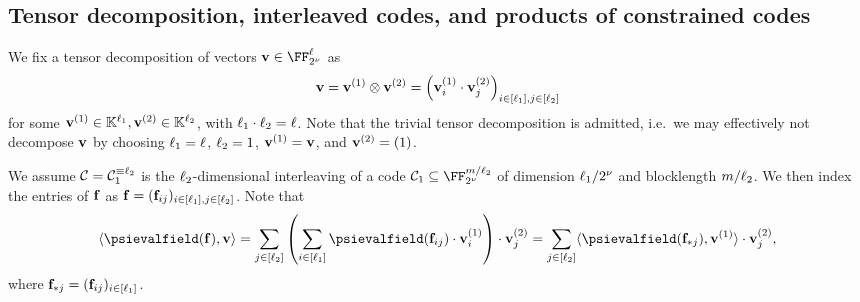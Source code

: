 \documentclass[11pt,letterpaper,usenames,dvipsnames]{article}
\begin{document}
\subsection{Tensor decomposition, interleaved codes, and products of constrained codes}
%
We fix a tensor decomposition of vectors $\vv\in \comfield^\codedim$ as $$\mathbf{v} = \mathbf{v}^{(1)} \otimes \mathbf{v}^{(2)} = \left(\mathbf{v}_i^{(1)}\cdot \mathbf{v}_j^{(2)}\right)_{i\in [\ell_1], j\in [\ell_2]}$$ for some $\mathbf{v}^{(1)}\in \mathbb{K}^{\ell_1}, \mathbf{v}^{(2)}\in \mathbb{K}^{\ell_2}$, with $\ell_1 \cdot \ell_2=\ell$. Note that the trivial tensor decomposition is admitted, i.e.\ we may effectively not decompose $\mathbf{v}$ by choosing $\ell_1=\ell$, $\ell_2=1$, $\mathbf{v}^{(1)}=\mathbf{v}$, and $\mathbf{v}^{(2)} = (1)$.

We assume $\mathcal{C} = \mathcal{C}_1^{\equiv \ell_2}$ is the $\ell_2$-dimensional interleaving of a code $\cC_1\subseteq \comfield^{\codelength/\codedim_2}$ of dimension $\ell_1/2^\nu$ and blocklength $m/\ell_2$.  We then index the entries of $\mathbf{f}$ as $\mathbf{f}=(\mathbf{f}_{ij})_{i\in [\ell_1], j\in[\ell_2]}$. Note that
%
$$
\langle \psievalfield(\bff), \vv \rangle = \sum_{j\in [\codedim_2]}\left(\sum_{i\in [\codedim_1]} \psievalfield(\bff_{ij}) \cdot \vv_i^{(1)}\right) \cdot \vv_j^{(2)} = \sum_{j\in [\codedim_2]} \langle \psievalfield(\bff_{*j}) , \vv^{(1)} \rangle \cdot \vv_j^{(2)},
$$
where $\mathbf{f}_{*j} = (\mathbf{f}_{ij})_{i\in[\ell_1]}$.








\end{document}
